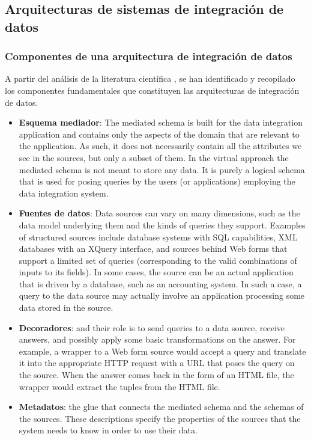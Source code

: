 \subsection{Arquitecturas de sistemas de integraci\'on de datos}

\subsubsection{Componentes de una arquitectura de integración de datos}

A partir del análisis de la literatura científica , se han identificado y recopilado los componentes fundamentales que constituyen las arquitecturas de integración de datos.

\begin{itemize}
    \item \textbf{Esquema mediador}: The mediated schema is built for the data integration application and contains only the aspects of the domain that are relevant to the application. As such, it does not necessarily contain all the attributes we see in the sources, but only a subset of them. In the virtual approach the mediated schema is not meant to store any data. It is purely a logical schema that is used for posing queries by the users (or applications) employing the data integration system.
    \item \textbf{Fuentes de datos}: Data sources can vary on many dimensions, such as the data model underlying them and the kinds of queries they support. Examples of structured sources include database systems with SQL capabilities, XML databases with an XQuery interface, and sources behind Web forms that support a limited set of queries (corresponding to the valid combinations of inputs to its fields). In some cases, the source can be an actual application that is driven by a database, such as an accounting system. In such a case, a query to the data source may actually involve an application processing some data stored in the source.
    \item \textbf{Decoradores}: and their role is to send queries to a data source, receive answers, and possibly apply some basic transformations on the answer. For example, a wrapper to a Web form source would accept a query and translate it into the appropriate HTTP request with a URL that poses the query on the source. When the answer comes back in the form of an HTML file, the wrapper would extract the tuples from the HTML file.
    \item \textbf{Metadatos}: the glue that connects the mediated schema and the schemas of the sources. These descriptions specify the properties of the sources that the system needs to know in order to use their data.

\end{itemize}
